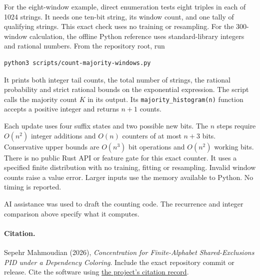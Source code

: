 \documentclass[11pt]{article}
\theoremstyle{definition}
\begin{document}
For the eight-window example, direct enumeration tests eight triples in each of 1024 strings.
It needs one ten-bit string, its window count, and one tally of qualifying strings. This exact
check uses no training or resampling. For the 300-window calculation, the offline Python
reference uses standard-library integers and rational numbers. From
the repository root, run
\begin{verbatim}
python3 scripts/count-majority-windows.py
\end{verbatim}
It prints both integer tail counts, the total number of strings, the rational probability
and strict rational bounds on the exponential expression. The script calls the majority
count $K$ in its output. Its \nolinkurl{majority_histogram(n)} function accepts a positive
integer and returns $n+1$ counts.

Each update uses four suffix states and two possible new bits. The $n$ steps require
$O(n^2)$ integer additions and $O(n)$ counters of at most $n+3$ bits. Conservative
upper bounds are $O(n^3)$ bit operations and $O(n^2)$ working bits. There is no public
Rust API or feature gate for this exact counter. It uses a specified finite distribution
with no training, fitting or resampling. Invalid window counts raise a value error. Larger
inputs use the memory available to Python. No timing is reported.

AI assistance was used to draft the counting code. The recurrence and integer comparison
above specify what it computes.

\paragraph{Citation.}
Sepehr Mahmoudian (2026), \emph{Concentration for Finite-Alphabet Shared-Exclusions PID
under a Dependency Coloring}. Include the exact repository commit or release. Cite the
software using \href{https://github.com/sepahead/pid-rs/blob/main/CITATION.cff}{the project's
citation record}.
\end{document}
